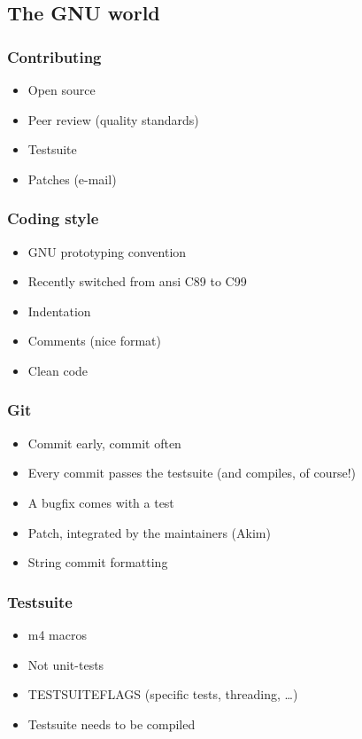 \documentclass{beamer}
\begin{document}
\subsection{The GNU world}

\begin{frame}
  \frametitle{Contributing}
    \begin{itemize}
      \item Open source
      \item Peer review (quality standards)
      \item Testsuite
      \item Patches (e-mail)
    \end{itemize}
\end{frame}

\begin{frame}
  \frametitle{Coding style}
    \begin{itemize}
      \item GNU prototyping convention
      \item Recently switched from ansi C89 to C99
      \item Indentation
      \item Comments (nice format)
      \item Clean code
    \end{itemize}
\end{frame}

\begin{frame}
  \frametitle{Git}
    \begin{itemize}
      \item Commit early, commit often
      \item Every commit passes the testsuite (and compiles, of course!)
      \item A bugfix comes with a test
      \item Patch, integrated by the maintainers (Akim)
      \item String commit formatting
    \end{itemize}
\end{frame}

\begin{frame}
  \frametitle{Testsuite}
    \begin{itemize}
      \item m4 macros
      \item Not unit-tests
      \item TESTSUITEFLAGS (specific tests, threading, \ldots)
      \item Testsuite needs to be compiled
    \end{itemize}
\end{frame}
\end{document}
